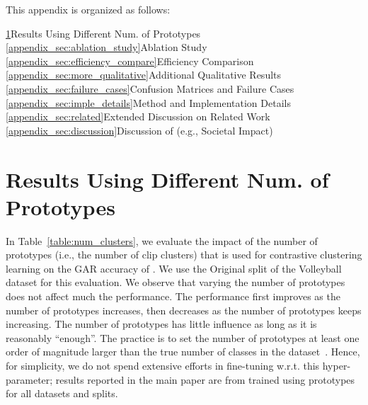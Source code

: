 \documentclass[runningheads]{llncs}
\begin{document}
\bigskip
\bigskip
\bigskip

\noindent This appendix is organized as follows:
\bigskip

\noindent \ref{appendix_sec:diff_num_protos}\quad Results Using Different Num. of Prototypes\\
\noindent \ref{appendix_sec:ablation_study}\quad Ablation Study\\
\noindent \ref{appendix_sec:efficiency_compare}\quad Efficiency Comparison\\
\noindent \ref{appendix_sec:more_qualitative}\quad Additional Qualitative Results\\
\noindent \ref{appendix_sec:failure_cases}\quad Confusion Matrices and Failure Cases\\
\noindent \ref{appendix_sec:imple_details}\quad Method and Implementation Details\\ 
\noindent \ref{appendix_sec:related}\quad Extended Discussion on Related Work\\ 
\noindent \ref{appendix_sec:discussion}\quad Discussion of \ours (e.g., Societal Impact)\\ 

\bigskip  


\renewcommand{\thesection}{A}
\section{Results Using Different Num. of Prototypes}
\label{appendix_sec:diff_num_protos} 

In Table~\ref{table:num_clusters}, we evaluate the impact of the number of prototypes  (i.e., the number of clip clusters) that is used for contrastive clustering learning on the GAR accuracy of \ourseos.  We use the Original split of the Volleyball dataset for this evaluation.  We observe  
that varying the number of prototypes 
does not affect much the performance. The performance  
first improves as the number of prototypes increases, then decreases as the number of prototypes keeps increasing. 
The number of prototypes has little influence as long as it is reasonably ``enough''. 
The practice is to set the number of prototypes at least one order of magnitude larger than the true number of classes in the dataset~\cite{swav}.
Hence, for simplicity, we do not spend extensive efforts in fine-tuning \ours w.r.t. this hyper-parameter; results reported in the main paper are from \ours trained using  prototypes for all datasets and splits.
\end{document}
